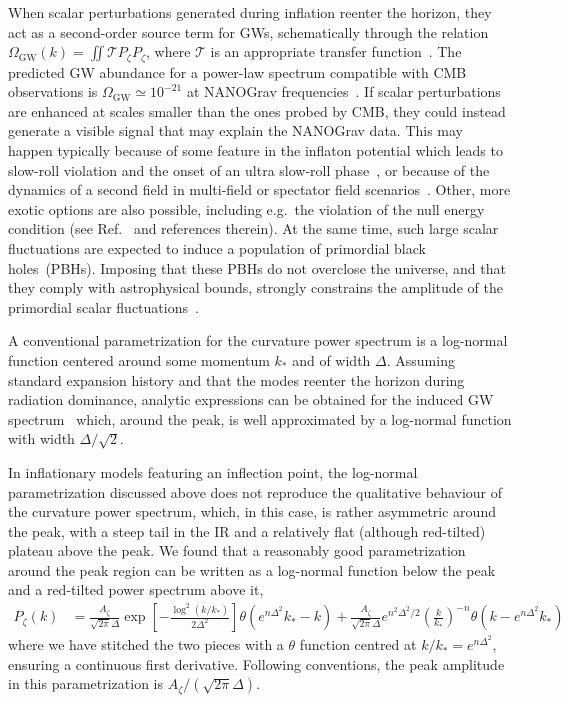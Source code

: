 \documentclass{article}
\begin{document}
When scalar perturbations generated during inflation reenter the horizon, they act as a second-order source term for GWs, schematically through the relation $\Omega_\mathrm{GW}(k) = \iint \mathcal{T} P_\zeta P_\zeta $, where $\mathcal{T}$ is an appropriate transfer function~\cite{Acquaviva:2002ud, Mollerach:2003nq, Ananda:2006af, Baumann:2007zm}. The predicted GW abundance for a power-law spectrum compatible with CMB observations is $\Omega_\mathrm{GW}\simeq 10^{-21}$ at NANOGrav frequencies~\cite{Ananda:2006af}. If scalar perturbations are enhanced at scales smaller than the ones probed by CMB, they could instead generate a visible signal that may explain the NANOGrav data. This may happen typically because of some feature in the inflaton potential which leads to slow-roll violation and the onset of an ultra slow-roll phase~\cite{Garcia-Bellido:2017mdw, Ballesteros:2017fsr}, or because of the dynamics of a second field in multi-field or spectator field scenarios~\cite{Cheong:2022gfc, Espinosa:2018eve}. Other, more exotic options are also possible, including e.g.\ the violation of the null energy condition (see Ref.~\cite{Cai:2023uhc} and references therein). At the same time, such large scalar fluctuations are expected to induce a population of primordial black holes~(PBHs). Imposing that these PBHs do not overclose the universe, and that they comply with astrophysical bounds, strongly constrains the amplitude of the primordial scalar fluctuations~\cite{Dandoy:2023jot}.

A conventional parametrization for the curvature power spectrum is a log-normal function centered around some momentum $k_*$ and of width $\Delta$.
Assuming standard expansion history and that the modes reenter the horizon during radiation dominance, analytic expressions can be obtained for the induced GW spectrum~\cite{Pi:2020otn, Dandoy:2023jot} which, around the peak, is well approximated by a log-normal function with width $\Delta/\sqrt{2}$.

In inflationary models featuring an inflection point, the log-normal parametrization discussed above does not reproduce the qualitative behaviour of the curvature power spectrum, which, in this case, is rather asymmetric around the peak, with a steep tail in the IR and a relatively flat (although red-tilted) plateau above the peak. We found that a reasonably good parametrization around the peak region can be written as a log-normal function below the peak and a red-tilted power spectrum above it,
\begin{align}\label{eq:broken ps scalar}
    P_\zeta (k) & = \frac{A_\zeta}{\sqrt{2\pi} \Delta} \exp \left[ - \frac{\log^2(k/k_*)}{2\Delta^2}\right] \theta(e^{n\Delta^2} k_*-k) + \frac{A_\zeta}{\sqrt{2\pi} \Delta} e^{n^2\Delta^2/2} \left( \frac{k}{k_*}\right)^{-n} \theta(k- e^{n\Delta^2} k_*)
\end{align}
%
where we have stitched the two pieces with a $\theta$ function centred at $k/k_* = e^{n\Delta^2}$, ensuring a continuous first derivative. Following conventions, the peak amplitude in this parametrization is $A_\zeta/(\sqrt{2\pi}\Delta)$.
\end{document}

